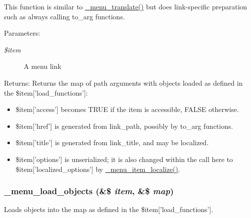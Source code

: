 This function is similar to \hyperlink{group__menu_g0e8535f35bcd1a03e71120a2d6ecc099}{\_\-menu\_\-translate()} but does link-specific preparation such as always calling to\_\-arg functions.

\begin{Desc}
\item[Parameters:]
\begin{description}
\item[{\em \$item}]A menu link \end{description}
\end{Desc}
\begin{Desc}
\item[Returns:]Returns the map of path arguments with objects loaded as defined in the \$item\mbox{[}'load\_\-functions'\mbox{]}:\begin{itemize}
\item \$item\mbox{[}'access'\mbox{]} becomes TRUE if the item is accessible, FALSE otherwise.\item \$item\mbox{[}'href'\mbox{]} is generated from link\_\-path, possibly by to\_\-arg functions.\item \$item\mbox{[}'title'\mbox{]} is generated from link\_\-title, and may be localized.\item \$item\mbox{[}'options'\mbox{]} is unserialized; it is also changed within the call here to \$item\mbox{[}'localized\_\-options'\mbox{]} by \hyperlink{group__menu_g3b0c0f37db66372ac4e90afa35b191e9}{\_\-menu\_\-item\_\-localize()}. \end{itemize}
\end{Desc}
\hypertarget{group__menu_g8aeba67f5ade33d997f9869ce3e41fa6}{
\subsubsection[{\_\-menu\_\-load\_\-objects}]{\setlength{\rightskip}{0pt plus 5cm}\_\-menu\_\-load\_\-objects (\&\$ {\em item}, \/  \&\$ {\em map})}}
\label{group__menu_g8aeba67f5ade33d997f9869ce3e41fa6}


Loads objects into the map as defined in the \$item\mbox{[}'load\_\-functions'\mbox{]}.

